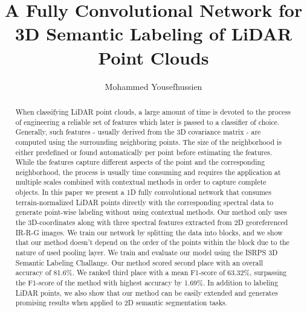 \documentclass[final,3p,times,twocolumn,authoryear]{elsarticle}
\begin{document}
\begin{frontmatter}



\title{A Fully Convolutional Network for 3D Semantic Labeling of LiDAR Point Clouds}


\author{Mohammed Yousefhussien}

\address{Rochester Institute of Technology}

\begin{abstract}
When classifying LiDAR point clouds, a large amount of time is devoted  to the process of engineering a reliable set of features which later is passed to a classifier of choice. Generally, such features - usually derived from the 3D covariance matrix - are computed using the surrounding neighboring points. The size of the neighborhood is either predefined or found automatically per point before estimating the features. While the features capture different aspects of the point and the corresponding neighborhood, the process is usually time consuming and requires the application at multiple scales combined with contextual methods in order to capture complete objects.  In this paper we present a 1D fully convolutional network that consumes terrain-normalized LiDAR points directly with the corresponding spectral data to generate point-wise labeling without using contextual methods. Our method only uses the 3D-coordinates along with three spectral features extracted from 2D georeferenced IR-R-G images. We train our network by splitting the data into blocks, and we show that our method doesn't depend on the order of the points within the block due to the nature of used pooling layer. We train and evaluate our model using the ISRPS 3D Semantic Labeling Challange. Our method scored second place with an overall accuracy of 81.6\%. We ranked third place with a mean F1-score of 63.32\%, surpassing the F1-score of the method with highest accuracy by 1.69\%. In addition to labeling LiDAR points, we also show that our method can be easily extended and generates promising results when applied to 2D semantic segmentation tasks.


\end{abstract}
\end{frontmatter}
\end{document}

